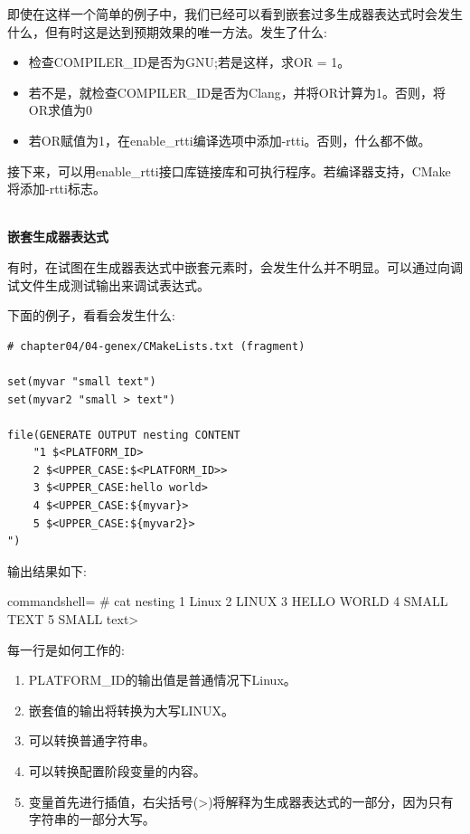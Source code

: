 即使在这样一个简单的例子中，我们已经可以看到嵌套过多生成器表达式时会发生什么，但有时这是达到预期效果的唯一方法。发生了什么:

\begin{itemize}
\item 
检查COMPILER\_ID是否为GNU;若是这样，求OR = 1。

\item 
若不是，就检查COMPILER\_ID是否为Clang，并将OR计算为1。否则，将OR求值为0

\item 
若OR赋值为1，在enable\_rtti编译选项中添加-rtti。否则，什么都不做。
\end{itemize}

接下来，可以用enable\_rtti接口库链接库和可执行程序。若编译器支持，CMake将添加-rtti标志。

\hspace*{\fill} \\ %
\noindent
\textbf{嵌套生成器表达式}

有时，在试图在生成器表达式中嵌套元素时，会发生什么并不明显。可以通过向调试文件生成测试输出来调试表达式。

下面的例子，看看会发生什么:

\begin{lstlisting}[style=styleCMake]
# chapter04/04-genex/CMakeLists.txt (fragment)

set(myvar "small text")
set(myvar2 "small > text")

file(GENERATE OUTPUT nesting CONTENT
	"1 $<PLATFORM_ID>
	2 $<UPPER_CASE:$<PLATFORM_ID>>
	3 $<UPPER_CASE:hello world>
	4 $<UPPER_CASE:${myvar}>
	5 $<UPPER_CASE:${myvar2}>
")
\end{lstlisting}

输出结果如下:

\begin{tcblisting}{commandshell={}}
# cat nesting
1 Linux
  2 LINUX
  3 HELLO WORLD
  4 SMALL TEXT
  5 SMALL text>
\end{tcblisting}

每一行是如何工作的:

\begin{enumerate}
\item 
PLATFORM\_ID的输出值是普通情况下Linux。

\item 
嵌套值的输出将转换为大写LINUX。

\item 
可以转换普通字符串。

\item 
可以转换配置阶段变量的内容。

\item 
变量首先进行插值，右尖括号(>)将解释为生成器表达式的一部分，因为只有字符串的一部分大写。
\end{enumerate}

